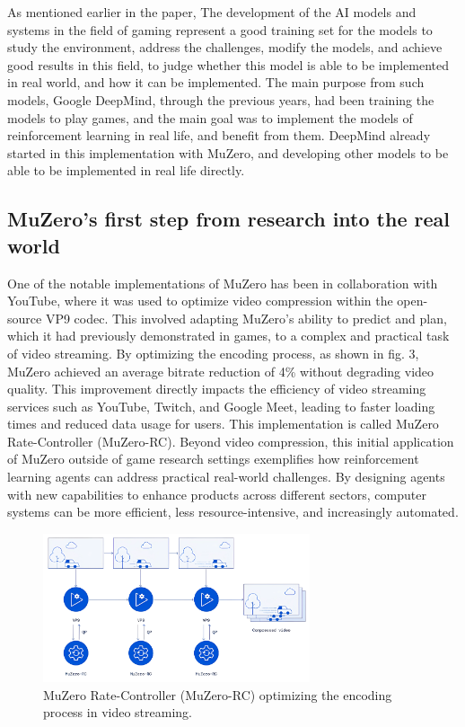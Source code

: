 
As mentioned earlier in the paper, The development of the AI models and systems
in the field of gaming represent a good training set for the models to study
the environment, address the challenges, modify the models, and achieve good
results in this field, to judge whether this model is able to be implemented in
real world, and how it can be implemented. The main purpose from such models,
Google DeepMind, through the previous years, had been training the models to
play games, and the main goal was to implement the models of reinforcement
learning in real life, and benefit from them. DeepMind already started in this
implementation with MuZero, and developing other models to be able to be
implemented in real life directly.
\subsection*{MuZero's first step from research into the real world}
One of the notable implementations of MuZero has been in collaboration with
YouTube, where it was used to optimize video compression within the open-source
VP9 codec. This involved adapting MuZero's ability to predict and plan, which
it had previously demonstrated in games, to a complex and practical task of
video streaming. By optimizing the encoding process, as shown in fig. 3, MuZero
achieved an average bitrate reduction of 4\% without degrading video
quality\cite{FD1}. This improvement directly impacts the efficiency of video
streaming services such as YouTube, Twitch, and Google Meet, leading to faster
loading times and reduced data usage for users. This implementation is called
MuZero Rate-Controller (MuZero-RC). Beyond video compression, this initial
application of MuZero outside of game research settings exemplifies how
reinforcement learning agents can address practical real-world challenges. By
designing agents with new capabilities to enhance products across different
sectors, computer systems can be more efficient, less resource-intensive, and
increasingly automated\cite{FD1}.
\begin{figure}[t]
    \centering
    \includegraphics[width=0.7\textwidth]{sections/8Future Directions/MuZeroRC.png}
    \caption{MuZero Rate-Controller (MuZero-RC) optimizing the encoding process in video streaming.}
\end{figure}
